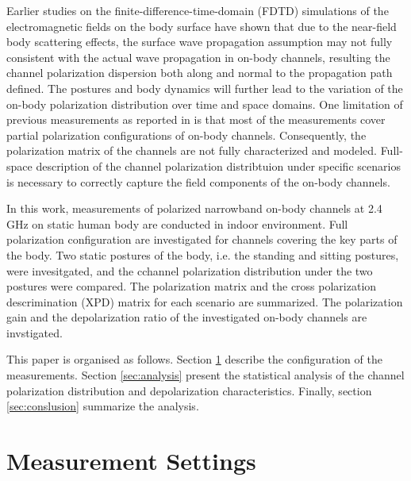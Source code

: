\documentclass[conference]{IEEEtran}
\begin{document}
Earlier studies on the finite-difference-time-domain (FDTD) simulations of the electromagnetic fields on the body surface \cite{} have shown that due to the near-field body scattering effects, the surface wave propagation assumption may not fully consistent with the actual wave propagation in on-body channels, resulting the channel polarization dispersion both along and normal to the propagation path defined. The postures and body dynamics will further lead to the variation of the on-body polarization distribution over time and space domains. One limitation of previous measurements as reported in \cite{6,7} is that most of the measurements cover partial polarization configurations of on-body channels. Consequently, the polarization matrix of the channels are not fully characterized and modeled. Full-space description of the channel polarization distribtuion under specific scenarios is necessary to correctly capture the field components of the on-body channels. 

In this work, measurements of polarized narrowband on-body channels at 2.4 GHz on static human body are conducted in indoor environment. Full polarization configuration are investigated for channels covering the key parts of the body. Two static postures of the body, i.e. the standing and sitting postures, were invesitgated, and the cchannel polarization distribution under the two postures were compared. The polarization matrix and the cross polarization descrimination (XPD) matrix for each scenario are summarized. The polarization gain and the depolarization ratio of the investigated on-body channels are invstigated.

This paper is organised as follows. Section \ref{sec:setup} describe the configuration of the measurements. Section \ref{sec:analysis} present the statistical analysis of the channel polarization distribution and depolarization characteristics. Finally, section \ref{sec:conslusion} summarize the analysis. 

\section{Measurement Settings}\label{sec:setup}
\end{document}
